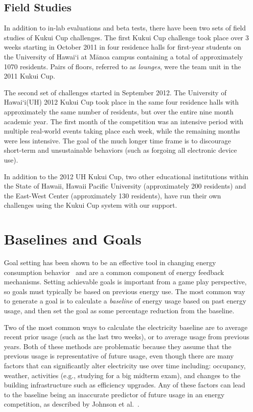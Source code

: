 \documentclass[10pt, conference, compsocconf]{IEEEtran-old}
\newcommand{\Hawaii}{Hawai`i\xspace}
\newcommand{\Manoa}{M\=anoa\xspace}
\begin{document}
\subsection{Field Studies}

In addition to in-lab evaluations and beta tests, there have been two sets of field studies of Kukui Cup challenges. The first Kukui Cup challenge took place over 3 weeks starting in October 2011 in four residence halls for first-year students on the University of \Hawaii at \Manoa campus containing a total of approximately 1070 residents. Pairs of floors, referred to as \emph{lounges}, were the team unit in the 2011 Kukui Cup.

The second set of challenges started in September 2012. The University of \Hawaii (UH) 2012 Kukui Cup took place in the same four residence halls with approximately the same number of residents, but over the entire nine month academic year. The first month of the competition was an intensive period with multiple real-world events taking place each week, while the remaining months were less intensive. The goal of the much longer time frame is to discourage short-term and unsustainable behaviors (such as forgoing all electronic device use).

In addition to the 2012 UH Kukui Cup, two other educational institutions within the State of Hawaii, Hawaii Pacific University (approximately 200 residents) and the East-West Center (approximately 130 residents), have run their own challenges using the Kukui Cup system with our support.

\section{Baselines and Goals}
\label{sec:goals-baselines}

Goal setting has been shown to be an effective tool in changing energy consumption behavior~\cite{Becker78, Houwelingen89} and are a common component of energy feedback mechanisms. Setting achievable goals is important from a game play perspective, so goals must typically be based on previous energy use. The most common way to generate a goal is to calculate a \emph{baseline} of energy usage based on past energy usage, and then set the goal as some percentage reduction from the baseline.

Two of the most common ways to calculate the electricity baseline are to average recent prior usage (such as the last two weeks), or to average usage from previous years. Both of these methods are problematic because they assume that the previous usage is representative of future usage, even though there are many factors that can significantly alter electricity use over time including: occupancy, weather, activities (e.g., studying for a big midterm exam), and changes to the building infrastructure such as efficiency upgrades. Any of these factors can lead to the baseline being an inaccurate predictor of future usage in an energy competition, as described by Johnson et al.~\cite{csdl2-12-08}.
\end{document}

